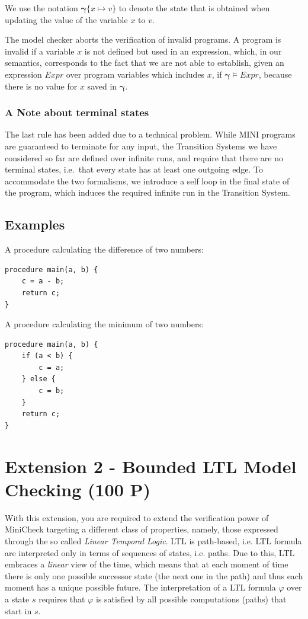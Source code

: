 \documentclass{article}
\begin{document}
We use the notation $\mathbf{\gamma}\{x \mapsto v\}$ to denote the state that is obtained when updating the value of the variable $x$ to $v$. 

The model checker aborts the verification of invalid programs. A program is invalid if a variable $x$ is not defined but used in an expression, which, in our semantics, corresponds to the fact that we are not able to establish, given an expression $Expr$ over program variables which includes $x$, if $\mathbf{\gamma} \vDash Expr$, because there is no value for $x$ saved in $\mathbf{\gamma}$.

\subsubsection*{A Note about terminal states}
The last rule has been added due to a technical problem. While MINI programs are guaranteed to terminate for any input, the Transition Systems we have considered so far are defined over infinite runs, and require that there are no terminal states, i.e.~that every state has at least one outgoing edge. To accommodate the two formalisms, we introduce a self loop in the final state of the program, which induces the required infinite run in the Transition System.

\subsection{Examples}

A procedure calculating the difference of two numbers:
\begin{lstlisting}
procedure main(a, b) {
    c = a - b;
    return c;
}
\end{lstlisting}

A procedure calculating the minimum of two numbers:
\begin{lstlisting}
procedure main(a, b) {
    if (a < b) {
        c = a;
    } else {
        c = b;
    }
    return c;
}
\end{lstlisting}


\section{Extension 2 - Bounded LTL Model Checking (100 P)}
\label{sec:ext2}
With this extension, you are required to extend the verification power of MiniCheck targeting a different class of properties, 
namely, those expressed through the so called \emph{Linear Temporal Logic}. 
LTL is path-based, i.e. LTL formula are interpreted only in terms of sequences of states, i.e. paths. 
Due to this, LTL embraces a \emph{linear} view of the time, 
which means that at each moment of time there is only one possible successor state (the next one in the path) 
and thus each moment has a unique possible future. 
The interpretation of a LTL formula $\varphi$ over a state $s$ requires that $\varphi$ is satisfied by all possible computations (paths) that start in $s$.
\end{document}
